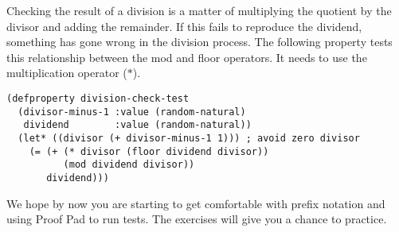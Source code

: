 Checking the result of a division is a matter
of multiplying the quotient by the divisor and adding the remainder.
If this fails to reproduce the dividend,
something has gone wrong in the division process.
The following property tests this relationship
between the \textsf{mod} and \textsf{floor} operators.
It needs to use the multiplication operator ($*$).

\label{division-check-test}
\begin{code}
\begin{verbatim}
(defproperty division-check-test
  (divisor-minus-1 :value (random-natural)
   dividend        :value (random-natural))
  (let* ((divisor (+ divisor-minus-1 1))) ; avoid zero divisor
    (= (+ (* divisor (floor dividend divisor))
          (mod dividend divisor))
       dividend)))
\end{verbatim}
\end{code}

We hope by now you are starting to get comfortable with prefix notation
and using Proof Pad to run tests.
The exercises will give you a chance to practice.

